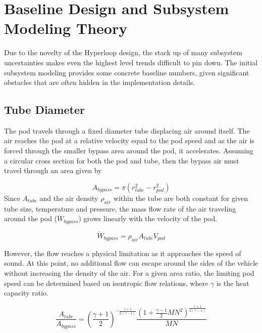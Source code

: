 \documentclass[heading.tex]{subfiles}
\begin{document}
\section{Baseline Design and Subsystem Modeling Theory}


Due to the novelty of the Hyperloop design, the stack up of many subsystem uncertainties makes even the highest level trends difficult to pin down.
The initial subsystem modeling provides some concrete baseline numbers, given significant obstacles that are often hidden in the implementation details. 

\subsection{Tube Diameter}


	The pod travels through a fixed diameter tube displacing air around itself. The air reaches the
pod at a relative velocity equal to the pod speed and as the air is forced through the smaller bypass area around the pod, it accelerates. Assuming a circular cross section
for both the pod and tube, then the bypass air must travel through an area given by

\begin{equation*}
A_{bypass} = \pi(r_{tube}^2-r_{pod}^2)
\end{equation*}
Since $A_{tube}$ and the air density $\rho_{air}$ within the tube are both constant for given tube size, temperature and pressure, the mass flow rate of
the air traveling around the pod ($\dot{W}_{bypass}$) grows linearly with the velocity of the pod.

\begin{equation*}
\dot{W}_{bypass} = \rho_{air} A_{tube} V_{pod}
\end{equation*}

However, the flow reaches a physical limitation as it approaches the speed of sound. At this point, no additional flow can escape
around the sides of the vehicle without increasing the density of the air.
For a given area ratio, the limiting pod speed can be determined based on isentropic flow relations, where $\gamma$ is the heat capacity ratio.

\begin{equation*}
\frac{A_{tube}}{A_{bypass}} = \left(\frac{\gamma+1}{2}\right)^{-\frac{\gamma+1}{2\left(\gamma-1\right)}}\frac{\left(1+\frac{\gamma-1}{2}MN^{2}\right)^{\frac{\gamma+1}{2\left(\gamma-1\right)}}}{MN}
\end{equation*}
\end{document}
